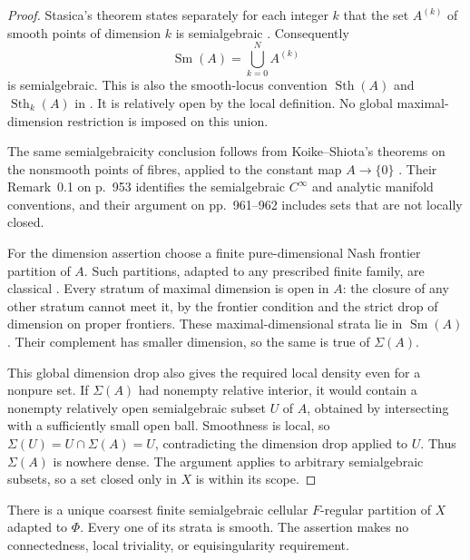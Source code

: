 \begin{proof}
Stasica's theorem states separately for each integer $k$ that the set
$A^{(k)}$ of smooth points of dimension $k$ is semialgebraic
\cite[Theorem~4, p.~152]{Stasica2003Smooth}.  Consequently
\[
 \operatorname{Sm}(A)=\bigcup_{k=0}^N A^{(k)}
\]
is semialgebraic.  This is also the smooth-locus convention
$\operatorname{Sth}(A)$ and $\operatorname{Sth}_k(A)$ in
\cite[\S2.A, pp.~635--636]{Fernando2018}.  It is relatively open by
the local definition.  No global maximal-dimension restriction is
imposed on this union.

The same semialgebraicity conclusion follows from Koike--Shiota's
theorems on the nonsmooth points of fibres, applied to the constant
map $A\to\{0\}$
\cite[Theorems~2.1--2.2 and Corollary~2.4, p.~956]{KoikeShiota2007}.
Their Remark~0.1 on p.~953 identifies the semialgebraic
$C^\infty$ and analytic manifold conventions, and their argument
on pp.~961--962 includes sets that are not locally closed.

For the dimension assertion choose a finite pure-dimensional Nash
frontier partition of $A$.  Such partitions, adapted to any prescribed
finite family, are classical
\cite[Theorem~1.3 and the frontier refinement following it,
pp.~3--4]{Coste2007}.  Every stratum of maximal dimension is open in
$A$: the closure of any other stratum cannot meet it, by the frontier
condition and the strict drop of dimension on proper frontiers.
These maximal-dimensional strata lie in $\operatorname{Sm}(A)$.
Their complement has smaller dimension, so the same is true of
$\Sigma(A)$.

This global dimension drop also gives the required local density even
for a nonpure set.  If $\Sigma(A)$ had nonempty relative interior,
it would contain a nonempty relatively open semialgebraic subset $U$
of $A$, obtained by intersecting with a sufficiently small open ball.
Smoothness is local, so
$\Sigma(U)=U\cap\Sigma(A)=U$, contradicting the dimension drop
applied to $U$.  Thus $\Sigma(A)$ is nowhere dense.  The argument
applies to arbitrary semialgebraic subsets, so a set closed only in
$X$ is within its scope.
\end{proof}

\begin{theorem}
\label{thm:coarsest-embedded-smooth-partition}
There is a unique coarsest finite semialgebraic cellular $F$-regular
partition of $X$ adapted to $\Phi$.  Every one of its strata is
smooth.  The assertion makes no connectedness, local triviality, or
equisingularity requirement.
\end{theorem}


